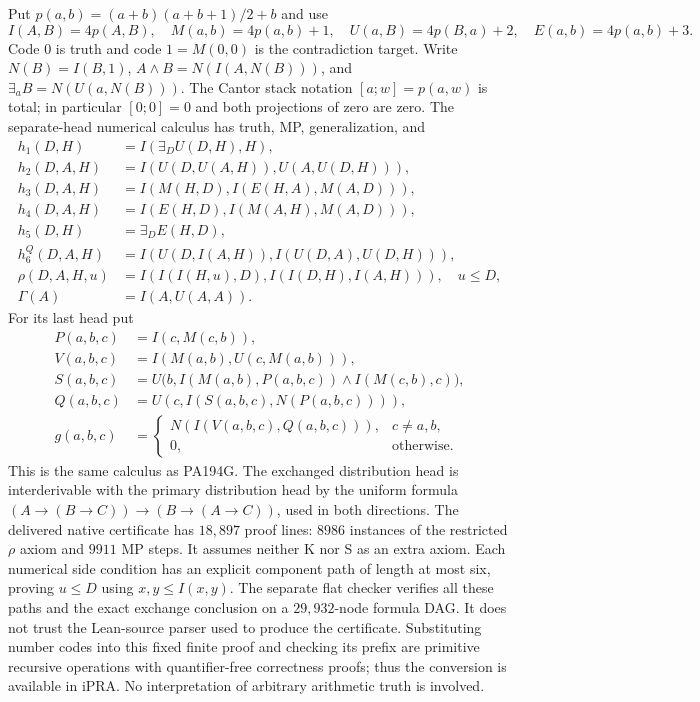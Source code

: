 Put $p(a,b)=(a+b)(a+b+1)/2+b$ and use
\[
 I(A,B)=4p(A,B),\quad M(a,b)=4p(a,b)+1,\quad
 U(a,B)=4p(B,a)+2,\quad E(a,b)=4p(a,b)+3.
\]
Code $0$ is truth and code $1=M(0,0)$ is the contradiction target.
Write $N(B)=I(B,1)$, $A\wedge B=N(I(A,N(B)))$, and
$\exists_a B=N(U(a,N(B)))$. The Cantor stack notation $[a;w]=p(a,w)$
is total; in particular $[0;0]=0$ and both projections of zero are zero.
The separate-head numerical calculus has truth, MP, generalization, and
\begin{align*}
 h_1(D,H)&=I(\exists_D U(D,H),H),\\
 h_2(D,A,H)&=I(U(D,U(A,H)),U(A,U(D,H))),\\
 h_3(D,A,H)&=I(M(H,D),I(E(H,A),M(A,D))),\\
 h_4(D,A,H)&=I(E(H,D),I(M(A,H),M(A,D))),\\
 h_5(D,H)&=\exists_D E(H,D),\\
 h_6^Q(D,A,H)&=I(U(D,I(A,H)),I(U(D,A),U(D,H))),\\
 \rho(D,A,H,u)&=I(I(I(H,u),D),I(I(D,H),I(A,H))),\quad u\le D,\\
 \Gamma(A)&=I(A,U(A,A)).
\end{align*}
For its last head put
\begin{align*}
 P(a,b,c)&=I(c,M(c,b)),\\
 V(a,b,c)&=I(M(a,b),U(c,M(a,b))),\\
 S(a,b,c)&=U\bigl(b,I(M(a,b),P(a,b,c))\wedge I(M(c,b),c)\bigr),\\
 Q(a,b,c)&=U(c,I(S(a,b,c),N(P(a,b,c)))),\\
 g(a,b,c)&=\begin{cases}N(I(V(a,b,c),Q(a,b,c))),&c\ne a,b,\\
                         0,&\text{otherwise.}\end{cases}
\end{align*}
This is the same calculus as PA194G. The exchanged distribution head is interderivable with the primary
distribution head by the uniform formula
$(A\to(B\to C))\to(B\to(A\to C))$, used in both directions.
The delivered native certificate has $18,897$ proof lines: $8986$
instances of the restricted $\rho$ axiom and $9911$ MP steps. It assumes
neither K nor S as an extra axiom. Each numerical side condition has an
explicit component path of length at most six, proving $u\le D$ using
$x,y\le I(x,y)$. The separate flat checker verifies all these paths and
the exact exchange conclusion on a $29,932$-node formula DAG. It does not
trust the Lean-source parser used to produce the certificate. Substituting
number codes into this fixed finite proof and checking its prefix are
primitive recursive operations with quantifier-free correctness proofs;
thus the conversion is available in iPRA. No interpretation of arbitrary
arithmetic truth is involved.

